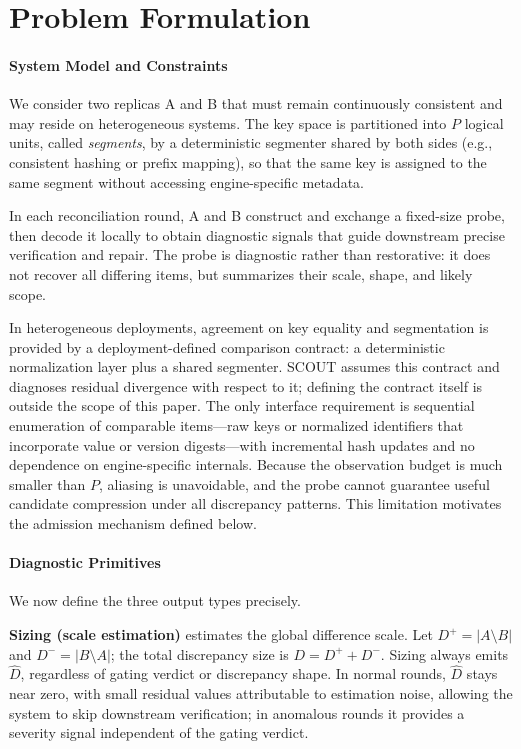 
\section{Problem Formulation}
\label{sec:problem}

\paragraph{System Model and Constraints}
We consider two replicas A and B that must remain continuously
consistent and may reside on heterogeneous
systems. The key space is partitioned into $P$ logical units,
called \emph{segments}, by a deterministic segmenter shared by
both sides (e.g., consistent hashing or prefix mapping), so
that the same key is assigned to the same segment without
accessing engine-specific metadata.

In each reconciliation round, A and B construct and exchange a
fixed-size probe, then decode it locally to obtain diagnostic
signals that guide downstream precise verification and repair.
The probe is diagnostic rather than restorative: it does not
recover all differing items, but summarizes their scale, shape,
and likely scope.

In heterogeneous deployments, agreement on key equality and
segmentation is provided by a deployment-defined comparison
contract: a deterministic normalization layer plus a shared
segmenter. SCOUT assumes this contract and diagnoses residual
divergence with respect to it; defining the contract itself is
outside the scope of this paper. The only interface requirement
is sequential enumeration of comparable items---raw keys or
normalized identifiers that incorporate value or version
digests---with incremental hash updates and no dependence on
engine-specific internals. Because the observation budget is
much smaller than $P$, aliasing is unavoidable, and the probe
cannot guarantee useful candidate compression under all
discrepancy patterns. This limitation motivates the admission
mechanism defined below.

\paragraph{Diagnostic Primitives}
\label{sec:problem-primitives}
We now define the three output types precisely.

\textbf{Sizing (scale estimation)} estimates the global difference scale. Let $D^{+}=|A\setminus B|$ and $D^{-}=|B\setminus A|$; the total discrepancy size is $D=D^{+}+D^{-}$. Sizing always emits $\hat{D}$, regardless of gating verdict or discrepancy shape. In normal rounds, $\hat{D}$ stays near zero, with small residual values attributable to estimation noise, allowing the system to skip downstream verification; in anomalous rounds it provides a severity signal independent of the gating verdict.

